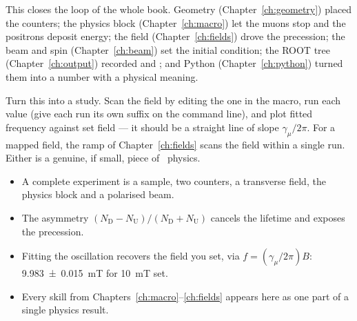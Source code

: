 \begin{keypoint}
This closes the loop of the whole book. Geometry (Chapter~\ref{ch:geometry}) placed the counters; the physics block (Chapter~\ref{ch:macro}) let the muons stop and the positrons deposit energy; the field (Chapter~\ref{ch:fields}) drove the precession; the beam and spin (Chapter~\ref{ch:beam}) set the initial condition; the ROOT tree (Chapter~\ref{ch:output}) recorded  and ; and Python (Chapter~\ref{ch:python}) turned them into a number with a physical meaning.
\end{keypoint}

\begin{tip}
Turn this into a study. Scan the field by editing the one  in the macro, run each value (give each run its own suffix on the command line), and plot fitted frequency against set field --- it should be a straight line of slope \(\gamma_\mu/2\pi\). For a mapped field, the  ramp of Chapter~\ref{ch:fields} scans the field within a single run. Either is a genuine, if small, piece of \muSR\ physics.
\end{tip}

\begin{recap}
\begin{itemize}
  \item A complete experiment is a sample, two counters, a transverse field, the physics block and a polarised beam.
  \item The asymmetry \((N_\mathrm{D}-N_\mathrm{U})/(N_\mathrm{D}+N_\mathrm{U})\) cancels the lifetime and exposes the precession.
  \item Fitting the oscillation recovers the field you set, via \(f=(\gamma_\mu/2\pi)B\): \SI{9.983(15)}{mT} for \SI{10}{mT} set.
  \item Every skill from Chapters~\ref{ch:macro}--\ref{ch:fields} appears here as one part of a single physics result.
\end{itemize}
\end{recap}
